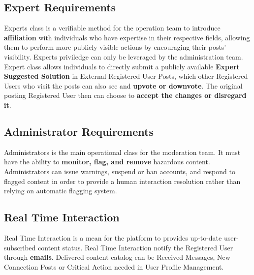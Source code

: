         \subsection{Expert Requirements}
        Experts class is a verifiable method for the operation team to introduce \textbf{affiliation} with individuals who have expertise in their respective fields, allowing them
        to perform more publicly visible actions by encouraging their posts' visibility. Experts priviledge can only be leveraged by the administration team.
        Expert class allows individuals to directly submit a publicly available \textbf{Expert Suggested Solution} in External Registered User Posts, which other Registered Users who 
        visit the posts can also see and \textbf{upvote or downvote}. The original posting Registered User then can choose to \textbf{accept the changes or disregard it}.

        \subsection{Administrator Requirements}
        Administrators is the main operational class for the moderation team. It must have the ability to \textbf{monitor, flag, and remove} hazardous content. 
        Administrators can issue warnings, suspend or ban accounts, and respond to flagged content in order to provide a human interaction resolution rather than 
        relying on automatic flagging system. 

        \subsection{Real Time Interaction}
        Real Time Interaction is a mean for the platform to provides up-to-date user-subscribed content status. Real Time Interaction notify the Registered User 
        through \textbf{emails}. Delivered content catalog can be Received Messages, New Connection Posts or Critical Action needed in User Profile Management.
\newpage


